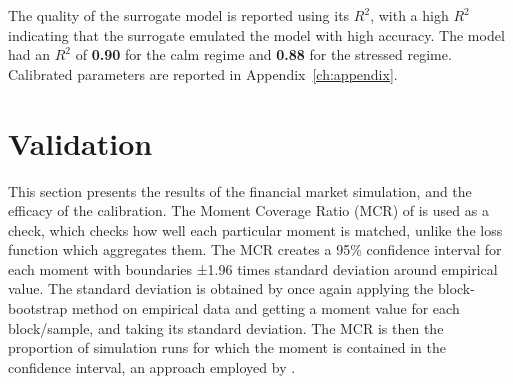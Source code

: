 The quality of the surrogate model is reported using its $R^2$, with a high $R^2$
indicating that the surrogate emulated the model with high accuracy. The model had an $R^2$ of \textbf{0.90} for the calm regime and \textbf{0.88} for the stressed regime. Calibrated parameters are reported in Appendix~\ref{ch:appendix}.

\section{Validation}
\label{sec:cal-validation}

This section presents the results of the financial market simulation, and the efficacy of the calibration. The Moment Coverage Ratio (MCR) of \cite{franke_westerhoff_2012} is used as a check, which checks how well each particular moment is matched, unlike the loss function which aggregates them. The MCR creates a 95\% confidence interval for each moment with boundaries ±1.96 times standard deviation around empirical value. The standard deviation is obtained by once again applying the block-bootstrap method on empirical data and getting a moment value for each block/sample, and taking its standard deviation. The MCR is then the proportion of simulation runs for which the moment is contained in the confidence interval, an approach employed by \cite{gao_2022_hfabm}.

